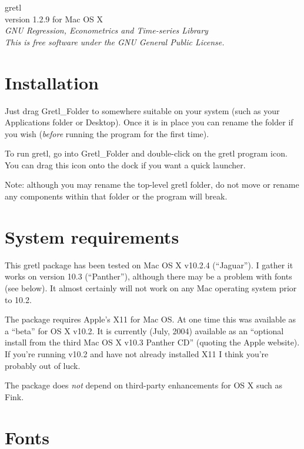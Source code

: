 \documentclass[11pt]{article}
\begin{document}
\begin{center}
{\color{gold} \titlefont gretl} \\[1ex]
version 1.2.9 for Mac OS X \\[2ex]

\textit{GNU Regression, Econometrics and Time-series Library\\
  This is free software under the GNU General Public License.}

\end{center}

\section{Installation}
\label{sec:install}

Just drag \textsf{Gretl\_Folder} to somewhere suitable on your system
(such as your Applications folder or Desktop).  Once it is in place
you can rename the folder if you wish (\textit{before} running the
program for the first time).

To run gretl, go into \textsf{Gretl\_Folder} and double-click on the
gretl program icon.  You can drag this icon onto the dock if you want
a quick launcher.  

Note: although you may rename the top-level gretl folder, do not move
or rename any components within that folder or the program will break.

\section{System requirements}
\label{sec:os}

This gretl package has been tested on Mac OS X v10.2.4 (``Jaguar'').
I gather it works on version 10.3 (``Panther''), although there may be
a problem with fonts (see below).  It almost certainly will
not work on any Mac operating system prior to 10.2.

The package requires Apple's X11 for Mac OS.  At one time this was
available as a ``beta'' for OS X v10.2.  It is currently (July, 2004)
available as an ``optional install from the third Mac OS X v10.3
Panther CD'' (quoting the Apple website).  If you're running v10.2 and
have not already installed X11 I think you're probably out of luck.

The package does \textit{not} depend on third-party enhancements for
OS X such as \textsf{Fink}.

\section{Fonts}
\label{sec:fonts}
\end{document}
